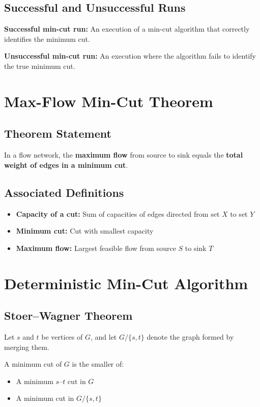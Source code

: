 \documentclass[12pt]{article}
\begin{document}
\subsection{Successful and Unsuccessful Runs}
\textbf{Successful min-cut run:}  
An execution of a min-cut algorithm that correctly identifies the minimum cut.

\textbf{Unsuccessful min-cut run:}  
An execution where the algorithm fails to identify the true minimum cut.

\section{Max-Flow Min-Cut Theorem}

\subsection{Theorem Statement}
In a flow network, the \textbf{maximum flow} from source to sink equals the \textbf{total weight of edges in a minimum cut}.

\subsection{Associated Definitions}
\begin{itemize}
    \item \textbf{Capacity of a cut:} Sum of capacities of edges directed from set $X$ to set $Y$
    \item \textbf{Minimum cut:} Cut with smallest capacity
    \item \textbf{Maximum flow:} Largest feasible flow from source $S$ to sink $T$
\end{itemize}

\section{Deterministic Min-Cut Algorithm}

\subsection{Stoer--Wagner Theorem}
Let $s$ and $t$ be vertices of $G$, and let $G/\{s,t\}$ denote the graph formed by merging them.

A minimum cut of $G$ is the smaller of:
\begin{itemize}
    \item A minimum $s$--$t$ cut in $G$
    \item A minimum cut in $G/\{s,t\}$
\end{itemize}
\end{document}
